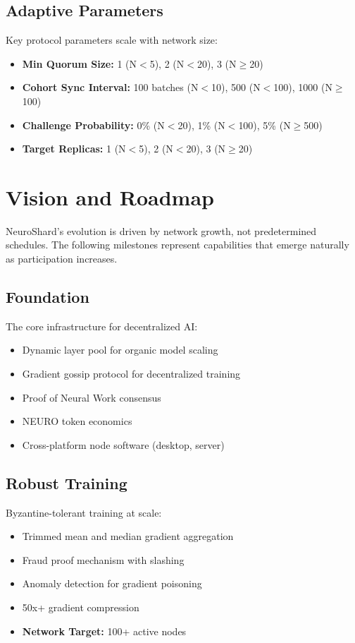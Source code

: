 \documentclass[11pt,a4paper]{article}
\begin{document}
\subsection{Adaptive Parameters}

Key protocol parameters scale with network size:
\begin{itemize}
    \item \textbf{Min Quorum Size:} 1 (N$<$5), 2 (N$<$20), 3 (N$\geq$20)
    \item \textbf{Cohort Sync Interval:} 100 batches (N$<$10), 500 (N$<$100), 1000 (N$\geq$100)
    \item \textbf{Challenge Probability:} 0\% (N$<$20), 1\% (N$<$100), 5\% (N$\geq$500)
    \item \textbf{Target Replicas:} 1 (N$<$5), 2 (N$<$20), 3 (N$\geq$20)
\end{itemize}

\section{Vision and Roadmap}

NeuroShard's evolution is driven by network growth, not predetermined schedules. The following milestones represent capabilities that emerge naturally as participation increases.

\subsection{Foundation}
The core infrastructure for decentralized AI:
\begin{itemize}
    \item Dynamic layer pool for organic model scaling
    \item Gradient gossip protocol for decentralized training
    \item Proof of Neural Work consensus
    \item NEURO token economics
    \item Cross-platform node software (desktop, server)
\end{itemize}

\subsection{Robust Training}
Byzantine-tolerant training at scale:
\begin{itemize}
    \item Trimmed mean and median gradient aggregation
    \item Fraud proof mechanism with slashing
    \item Anomaly detection for gradient poisoning
    \item 50x+ gradient compression
    \item \textbf{Network Target:} 100+ active nodes
\end{itemize}
\end{document}
